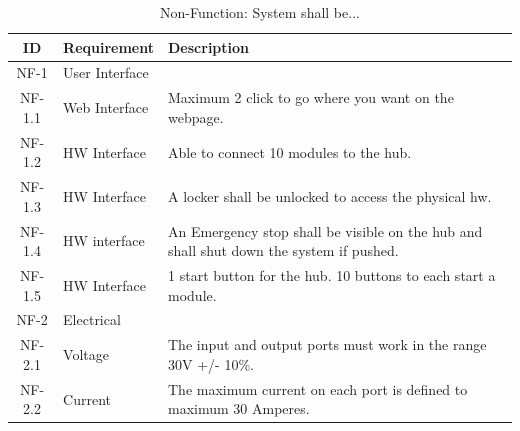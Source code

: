 \begin{table}[H]
	\begin{tabular} [b] {| c |  p{3cm} | p{10cm} |}
	\hline
	\textbf{ID} & \textbf{Requirement} & \textbf{Description} \\\hline
		NF-1 & User Interface 	&  \\ \hline
		NF-1.1 & Web Interface 	& Maximum 2 click to go where you want on the webpage. \\ \hline
		NF-1.2 & HW Interface	& Able to connect 10 modules to the hub. \\ \hline
		NF-1.3 & HW Interface	& A locker shall be unlocked to access the physical hw. \\ \hline
		NF-1.4 & HW interface	& An Emergency stop shall be visible on the hub and shall shut down the system if pushed. \\ \hline
		NF-1.5 & HW Interface	& 1 start button for the hub. 10 buttons to each start a module. \\ \hline
		NF-2 & Electrical 		&  \\ \hline
		NF-2.1 & Voltage 		& The input and output ports must work in the range 30V +/-  10\%.\\ \hline
		NF-2.2 & Current 		& The maximum current on each port is defined to maximum 30 Amperes. \\ \hline
	\end{tabular}
	\caption{Non-Function: System shall be...}
\end{table}
